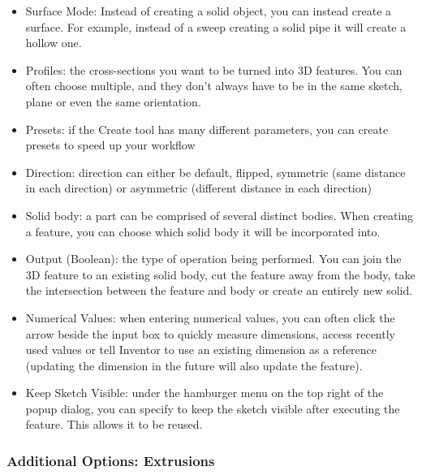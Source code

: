 \begin{itemize}

\item Surface Mode: Instead of creating a solid object, you can instead create a surface. For example, instead of a sweep creating a solid pipe it will create a hollow one.
\item Profiles: the cross-sections you want to be turned into 3D features. You can often choose multiple, and they don't always have to be in the same sketch, plane or even the same orientation.
\item Presets: if the Create tool has many different parameters, you can create presets to speed up your workflow
\item Direction: direction can either be default, flipped, symmetric (same distance in each direction) or asymmetric (different distance in each direction)
\item Solid body: a part can be comprised of several distinct bodies. When creating a feature, you can choose which solid body it will be incorporated into.
\item Output (Boolean): the type of operation being performed. You can join the 3D feature to an existing solid body, cut the feature away from the body, take the intersection between the feature and body or create an entirely new solid.
\item Numerical Values: when entering numerical values, you can often click the arrow beside the input box to quickly measure dimensions, access recently used values or tell Inventor to use an existing dimension as a reference (updating the dimension in the future will also update the feature).
\item Keep Sketch Visible: under the hamburger menu on the top right of the popup dialog, you can specify to keep the sketch visible after executing the feature. This allows it to be reused.

\end{itemize}

\subsubsection{Additional Options: Extrusions}


